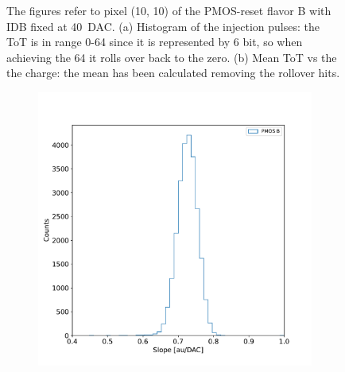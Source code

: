 \begin{figure}
\begin{subfigure}[b]{0.49\textwidth}
                \caption{}
                \label{fig:ToT_vs_charge}
            \end{subfigure}
            \caption{The figures refer to pixel (10, 10) of the PMOS-reset flavor B with IDB fixed at \SI{40}{DAC}.
            (a) Histogram of the injection pulses: the ToT is in range 0-64 since it is represented by 6 bit, so when achieving the 64 it rolls over back to the zero. (b) Mean ToT vs the the charge: the mean has been calculated removing the rollover hits.}
            \label{fig:ToT}
       \end{figure}
   
       \begin{figure}
        \centering
        \begin{subfigure}[b]{0.49\textwidth}
            \centering
            \includegraphics[width=\linewidth]{figures/charaterization/slope_histogram.pdf}
            \caption{}
            \label{fig:slope_histo}
        \end{subfigure}
        \hfill
        \begin{subfigure}[b]{0.49\textwidth}
            \centering

\end{subfigure}
\end{figure}
